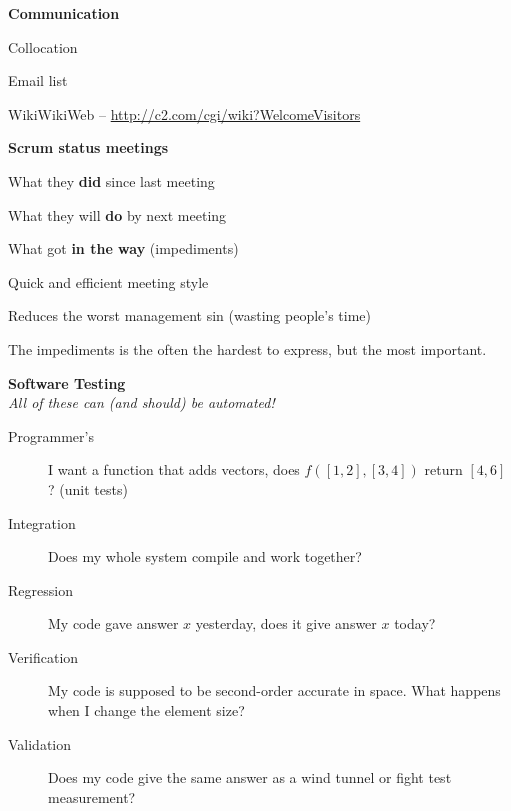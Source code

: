 \documentclass[landscape]{slides}
\renewcommand{\title}[1]{{\large\bfseries #1}}
\newenvironment{itemiz}%
  {\begin{list}{}{\raggedright
      \setlength{\itemsep}{2pt}%
      \setlength{\parskip}{4pt}\setlength{\parsep}{2pt}}}%
  {\end{list}}%
\begin{document}
 \begin{slide}
  \title{Communication}
  \begin{itemiz}
  \item Collocation
  \item Email list
  \item WikiWikiWeb --  \url{http://c2.com/cgi/wiki?WelcomeVisitors}
  \end{itemiz}
  \title{Scrum status meetings}
  \begin{itemiz}
  \item What they {\bf did} since last meeting
  \item What they will {\bf do} by next meeting
  \item What got {\bf in the way} (impediments)
  \end{itemiz}
  \begin{itemiz}
    \item Quick and efficient meeting style
    \item Reduces the worst management sin (wasting people's time)
    \item The impediments is the often the hardest to express, but the
    most important.
  \end{itemiz}
 \end{slide}
 
 \begin{slide}
   \title{Software Testing} \\
   \emph{All of these can (and should) be automated!}
   \begin{description}
   \item[Programmer's] I want a function that adds vectors, does 
   $f([1, 2], [3, 4])$ return $[4, 6]$? (unit tests)
   \item[Integration] Does my whole system compile and work together?
   \item[Regression] My code gave answer $x$ yesterday, does it give
   answer $x$ today?
   \item[Verification] My code is supposed to be second-order accurate
   in space. What happens when I change the element size?
   \item[Validation] Does my code give the same answer as a wind
   tunnel or fight test measurement?
   \end{description}
 \end{slide}
 
\end{document}
